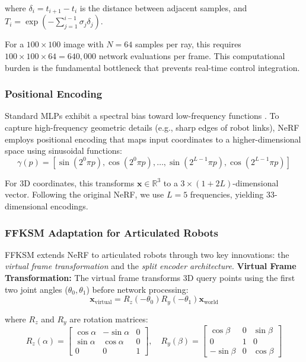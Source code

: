 \documentclass[12pt,a4paper,oneside]{report}
\begin{document}
where $\delta_i = t_{i+1} - t_i$ is the distance between adjacent samples, and $T_i = \exp\left(-\sum_{j=1}^{i-1} \sigma_j \delta_j\right)$.

For a $100 \times 100$ image with $N = 64$ samples per ray, this requires $100 \times 100 \times 64 = 640,000$ network evaluations per frame. This computational burden is the fundamental bottleneck that prevents real-time control integration.
\subsubsection{Positional Encoding}
\label{subsubsec:positional_encoding}

Standard MLPs exhibit a spectral bias toward low-frequency functions \cite{rahaman2019spectral}. To capture high-frequency geometric details (e.g., sharp edges of robot links), NeRF employs positional encoding that maps input coordinates to a higher-dimensional space using sinusoidal functions:
\begin{equation}\gamma(p) = [\sin(2^0 \pi p), \cos(2^0 \pi p), \ldots, \sin(2^{L-1} \pi p), \cos(2^{L-1} \pi p)]
\end{equation}

For 3D coordinates, this transforms $\mathbf{x} \in \mathbb{R}^3$ to a $3 \times (1 + 2L)$-dimensional vector. Following the original NeRF, we use $L = 5$ frequencies, yielding 33-dimensional encodings.
\subsubsection{FFKSM Adaptation for Articulated Robots}
\label{subsubsec:ffksm_adaptation_for_articulated_robots}

FFKSM extends NeRF to articulated robots through two key innovations: the \textit{virtual frame transformation} and the \textit{split encoder architecture}.
\textbf{Virtual Frame Transformation:} The virtual frame transforms 3D query points using the first two joint angles ($\theta_0, \theta_1$) before network processing:
\begin{equation}\mathbf{x}_{\text{virtual}} = R_z(-\theta_0) R_y(-\theta_1) \mathbf{x}_{\text{world}}
\end{equation}

where $R_z$ and $R_y$ are rotation matrices:
\begin{equation}R_z(\alpha) = \begin{bmatrix}
\cos\alpha & -\sin\alpha & 0 \\
\sin\alpha & \cos\alpha & 0 \\
0 & 0 & 1
\end{bmatrix}, \quad
R_y(\beta) = \begin{bmatrix}
\cos\beta & 0 & \sin\beta \\
0 & 1 & 0 \\
-\sin\beta & 0 & \cos\beta
\end{bmatrix}
\end{equation}
\end{document}
